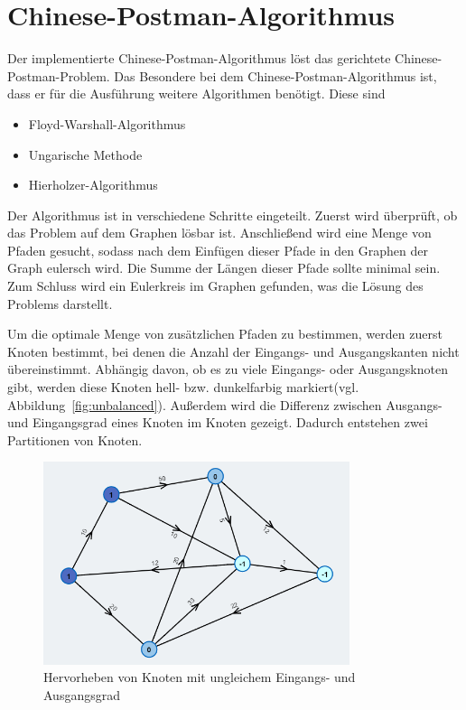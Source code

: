 \section{Chinese-Postman-Algorithmus}%
Der implementierte Chinese-Postman-Algorithmus löst das gerichtete Chinese-Postman-Problem. 
Das Besondere bei dem Chinese-Postman-Algorithmus ist, dass er für die Ausführung weitere Algorithmen benötigt. Diese sind 
\begin{itemize}
\item Floyd-Warshall-Algorithmus
\item Ungarische Methode
\item Hierholzer-Algorithmus
\end{itemize}
Der Algorithmus ist in verschiedene Schritte eingeteilt. Zuerst wird überprüft, ob das Problem auf dem Graphen lösbar ist. Anschließend wird eine Menge von Pfaden gesucht, sodass nach dem Einfügen dieser Pfade in den Graphen der Graph eulersch wird. Die Summe der Längen dieser Pfade sollte minimal sein.
Zum Schluss wird ein Eulerkreis im Graphen gefunden, was die Lösung des Problems darstellt.

Um die optimale Menge von zusätzlichen Pfaden zu bestimmen, werden zuerst Knoten bestimmt, bei denen die Anzahl der Eingangs- und Ausgangskanten nicht übereinstimmt.
Abhängig davon, ob es zu viele Eingangs- oder Ausgangsknoten gibt, werden diese Knoten hell- bzw. dunkelfarbig markiert(vgl. Abbildung~\ref{fig:unbalanced}). Außerdem wird die Differenz zwischen Ausgangs- und Eingangsgrad eines Knoten im Knoten gezeigt. Dadurch entstehen zwei Partitionen von Knoten. 

\begin{figure}[h!]
	\centering
	\includegraphics[width=0.8\textwidth]{figures/postman_unbalanced}
	\caption[Unbalancierte Knoten]{Hervorheben von Knoten mit ungleichem Eingangs- und Ausgangsgrad}\label{fig:postman_unbalanced}
\end{figure}

